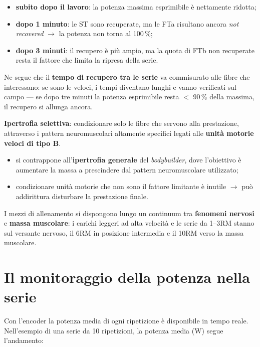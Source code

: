 \begin{itemize}
  \item \textbf{subito dopo il lavoro}: la potenza massima esprimibile è nettamente ridotta;
  \item \textbf{dopo 1 minuto}: le ST sono recuperate, ma le FTa risultano ancora \textit{not
    recovered} $\rightarrow$ la potenza non torna al 100\,\%;
  \item \textbf{dopo 3 minuti}: il recupero è più ampio, ma la quota di FTb non recuperate resta il
    fattore che limita la ripresa della serie.
\end{itemize}

Ne segue che il \textbf{tempo di recupero tra le serie} va commisurato alle fibre che interessano:
se sono le veloci, i tempi diventano lunghi e vanno verificati sul campo --- se dopo tre minuti la
potenza esprimibile resta $<$ 90\,\% della massima, il recupero si allunga ancora.

\textbf{Ipertrofia selettiva}: condizionare solo le fibre che servono alla prestazione, attraverso i
pattern neuromuscolari altamente specifici legati alle \textbf{unità motorie veloci di tipo B}.
\begin{itemize}
  \item si contrappone all'\textbf{ipertrofia generale} del \textit{bodybuilder}, dove l'obiettivo è
    aumentare la massa a prescindere dal pattern neuromuscolare utilizzato;
  \item condizionare unità motorie che non sono il fattore limitante è inutile $\rightarrow$ può
    addirittura disturbare la prestazione finale.
\end{itemize}

I mezzi di allenamento si dispongono lungo un continuum tra \textbf{fenomeni nervosi} e
\textbf{massa muscolare}: i carichi leggeri ad alta velocità e le serie da 1--3RM stanno sul
versante nervoso, il 6RM in posizione intermedia e il 10RM verso la massa muscolare.

\section{Il monitoraggio della potenza nella serie}

Con l'encoder la potenza media di ogni ripetizione è disponibile in tempo reale. Nell'esempio di una
serie da 10 ripetizioni, la potenza media (W) segue l'andamento:

